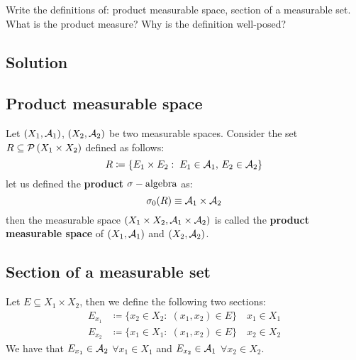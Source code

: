 
\question
Write the definitions of: product measurable space, section of a measurable set. What is the product measure? Why is the definition well-posed?

\subsection*{Solution}

\subsection{Product measurable space}
Let $(X_1, \mathcal{A}_1)$, $(X_2, \mathcal{A}_2)$ be two measurable spaces. Consider the set $R\subseteq \mathcal{P}\left(X_1 \times X_2\right)$ defined as follows:
\[
    R \coloneqq \{ E_1 \times E_2: \; E_1 \in \mathcal{A}_1, \, E_2 \in \mathcal{A}_2 \}    
\]
let us defined the \textbf{product $\sigma-\text{algebra}$} as:
\[
    \sigma_0(R) \equiv \mathcal{A}_1 \times \mathcal{A}_2   
\]
then the measurable space $(X_1 \times X_2, \mathcal{A}_1 \times \mathcal{A}_2)$ is called the \textbf{product measurable space} of $(X_1, \mathcal{A}_1)$ and $(X_2, \mathcal{A}_2)$.

\subsection{Section of a measurable set}
Let $E\subseteq X_1 \times X_2$, then we define the following two sections:
\begin{align*}
    E_{x_1} & \coloneqq \{ x_2 \in X_2: \; (x_1, x_2) \in E \} \quad x_1 \in X_1 \\
    E_{x_2} & \coloneqq \{ x_1 \in X_1: \; (x_1, x_2) \in E \} \quad x_2 \in X_2
\end{align*}
We have that $E_{x_1} \in \mathcal{A}_2$ $\forall x_1\in X_1$ and $E_{x_2} \in \mathcal{A}_1$ $\forall x_2\in X_2$.

